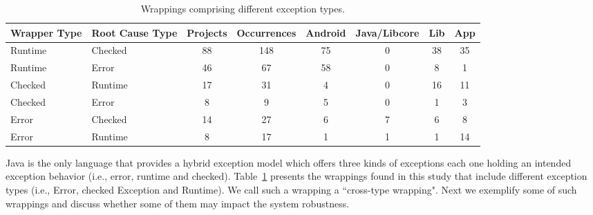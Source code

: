 \documentclass[conference]{IEEEtran}
\begin{document}
\begin{table}
  \centering
  \begin{tabular}{llcccccc}
    \hline
    \bfseries{Wrapper Type}  &  \bfseries{Root Cause Type} &  \bfseries{Projects}  &  \bfseries{Occurrences} & \textsf{Android} & \textsf{Java/Libcore} & \textsf{Lib} & \textsf{App}  \\
    \hline
      
      Runtime &  Checked   & 88 & 148 &  75 &  0   & 38 &  35 \\  %
      Runtime   &  Error      & 46  &  67    &  58  &  0   & 8  &  1   \\      %
      Checked &  Runtime   & 17  & 31 & 4 &  0  & 16  &  11 \\  %
      Checked & Error         & 8    &  9  & 5  &  0  &  1 &  3  \\
      Error & Checked         & 14  &  27 &  6  &  7  &  6 &   8    \\
      Error & Runtime        & 8      &  17   & 1 &  1  & 1 &  14    \\

  \hline
  \end{tabular}
\caption{Wrappings comprising different exception types.}
\label{tab:wrappingandroid}
\end{table}

Java is the only language that provides a hybrid exception model 
which offers three kinds of exceptions each one holding an intended exception behavior (i.e., error, 
runtime and checked). Table~\ref{tab:wrappingandroid} presents the wrappings found in this study that
include different exception types (i.e., Error, checked Exception and Runtime). We call 
such a wrapping a ``cross-type wrapping". Next we exemplify some of such
 wrappings and discuss whether some of them may impact the system robustness.
\end{document}
